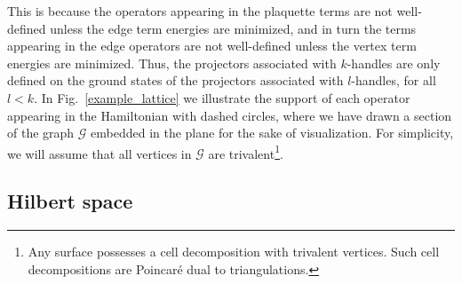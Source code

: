 \documentclass[12pt,a4paper]{article}
\newcommand{\mcg}{\mathcal{G}}
\newcommand{\kw}[1]{{\color{kwcolor}\footnotesize{(KW) #1}}}
\newcommand{\dave}[1]{{\color{ao(english)}\footnotesize{(DA) #1}}}
\newcommand{\ethan}[1]{{\color{amethyst}\footnotesize{(EL) #1}}}
\begin{document}
This is because the operators appearing in the plaquette terms are not well-defined unless the edge term energies are minimized, and in turn the terms appearing in the edge operators are not well-defined unless the vertex term energies are minimized.
Thus, the projectors associated with $k$-handles are only defined on the ground states of the projectors associated with $l$-handles, for all $l<k$.  
In Fig.~\ref{example_lattice} we illustrate the support of each operator appearing in the Hamiltonian with dashed circles, where we have drawn a section of the graph $\mcg$ embedded in the plane for the sake of visualization. 
For simplicity, we will assume that all vertices in $\mcg$ are trivalent\footnote{Any surface possesses a cell decomposition with trivalent vertices.
Such cell decompositions are Poincar\'e dual to triangulations.}.




\subsection{Hilbert space} \label{hilbertspacesect}

\end{document}
